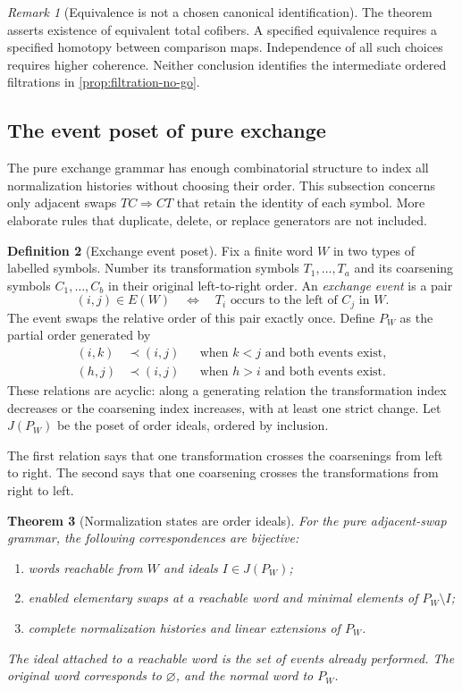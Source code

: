 \documentclass[11pt]{article}
\newtheorem{theorem}{Theorem}[section]
\theoremstyle{definition}
\newtheorem{definition}[theorem]{Definition}
\theoremstyle{remark}
\newtheorem{remark}[theorem]{Remark}
\begin{document}
\begin{remark}[Equivalence is not a chosen canonical identification]
The theorem asserts existence of equivalent total cofibers. A specified equivalence requires a specified homotopy between comparison maps. Independence of all such choices requires higher coherence. Neither conclusion identifies the intermediate ordered filtrations in \cref{prop:filtration-no-go}.
\end{remark}

\subsection{The event poset of pure exchange}

The pure exchange grammar has enough combinatorial structure to index all normalization histories without choosing their order. This subsection concerns only adjacent swaps $TC\Rightarrow CT$ that retain the identity of each symbol. More elaborate rules that duplicate, delete, or replace generators are not included.

\begin{definition}[Exchange event poset]\label{def:event-poset}
Fix a finite word $W$ in two types of labelled symbols. Number its transformation symbols $T_1,\ldots,T_a$ and its coarsening symbols $C_1,\ldots,C_b$ in their original left-to-right order. An \emph{exchange event} is a pair
\[
(i,j)\in E(W)
\quad\Longleftrightarrow\quad
T_i\text{ occurs to the left of }C_j\text{ in }W.
\]
The event swaps the relative order of this pair exactly once. Define $P_W$ as the partial order generated by
\begin{align*}
(i,k)&\prec(i,j) &&\text{when }k<j\text{ and both events exist},\\
(h,j)&\prec(i,j) &&\text{when }h>i\text{ and both events exist}.
\end{align*}
These relations are acyclic: along a generating relation the transformation index decreases or the coarsening index increases, with at least one strict change. Let $J(P_W)$ be the poset of order ideals, ordered by inclusion.
\end{definition}

The first relation says that one transformation crosses the coarsenings from left to right. The second says that one coarsening crosses the transformations from right to left.

\begin{theorem}[Normalization states are order ideals]\label{thm:event-ideals}
For the pure adjacent-swap grammar, the following correspondences are bijective:
\begin{enumerate}
\item words reachable from $W$ and ideals $I\in J(P_W)$;
\item enabled elementary swaps at a reachable word and minimal elements of $P_W\setminus I$;
\item complete normalization histories and linear extensions of $P_W$.
\end{enumerate}
The ideal attached to a reachable word is the set of events already performed. The original word corresponds to $\varnothing$, and the normal word to $P_W$.
\end{theorem}
\end{document}
